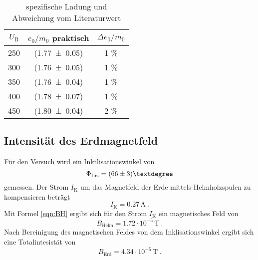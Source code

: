 \begin{table}
  \centering
  \begin{tabular}{c| c c}
    \toprule
    $U_\text{B}$  & $e_0/m_0$ praktisch & $\Delta e_0/m_0$ \\
    \midrule
    	250	& (\num{1.77 +- 0.05}) & 1 \% \\
	300	& (\num{1.76 +- 0.05}) & 1 \% \\
	350	& (\num{1.76 +- 0.04}) & 1 \% \\
	400	& (\num{1.78 +- 0.07}) & 1 \% \\
	450	& (\num{1.80 +- 0.04}) & 2 \% \\
    \bottomrule
  \end{tabular}
  \caption{spezifische Ladung und Abweichung vom Literaturwert}
  \label{tab:e0m0}
\end{table}
\subsection{Intensität des Erdmagnetfeld}
Für den Versuch wird ein Inktlisationswinkel von
\begin{equation}
  \Phi_\text{Inc} = (\num{66 +-3})°
  \label{eqn:Inc}
\end{equation}
gemessen. Der Strom $I_\text{K}$ um das Magnetfeld der Erde mittels Helmholzspulen zu kompensieren beträgt
\begin{equation}
  I_\text{K} = 0.27 \, \text{A} \ .
  \label{IK}
\end{equation}
Mit Formel \ref{eqn:BH} ergibt sich für den Strom $I_\text{K}$ ein magnetisches Feld von
\begin{equation}
  B_\text{Helm} = 1.72 \cdot 10^{-5} \, \text{T} \ .
  \label{eqn:Binc}
\end{equation}
Nach Bereinigung des magnetischen Feldes von dem Inklisationswinkel ergibt sich eine Totalintesistät von
\begin{equation}
  B_\text{Erd} = 4.34 \cdot 10^{-5} \, \text{T} \ .
  \label{eqn:Berd}
\end{equation}
